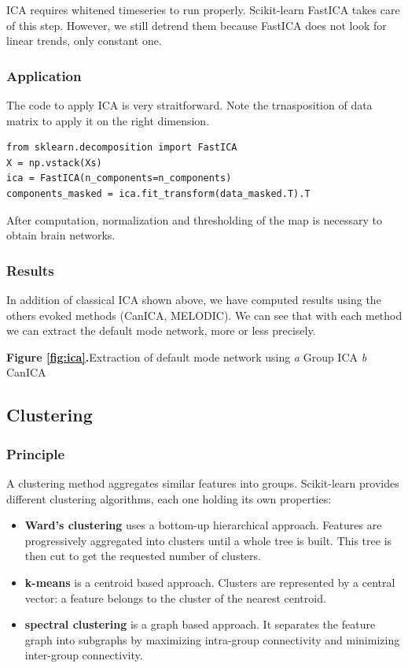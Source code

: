 \documentclass{frontiersSCNS} %
\newcommand{\alex}[1]{\todo[inline, color=green!40]{#1}}
\begin{document}
ICA requires whitened timeseries to run properly. Scikit-learn FastICA takes care
of this step. However, we still detrend them because
FastICA does not look for linear trends, only constant one.

\subsubsection{Application}

The code to apply ICA is very straitforward. Note the trnasposition of data
matrix to apply it on the right dimension.

\begin{lstlisting}
from sklearn.decomposition import FastICA
X = np.vstack(Xs)
ica = FastICA(n_components=n_components)
components_masked = ica.fit_transform(data_masked.T).T
\end{lstlisting}

After computation, normalization and thresholding of the map is necessary to
obtain brain networks.

\subsubsection{Results}

In addition of classical ICA shown above, we have computed results using the
others evoked methods (CanICA, MELODIC). We can see that with each method we can
extract the default mode network, more or less precisely.

\textbf{Figure \ref{fig:ica}.}{Extraction of default mode network using \textit{a} Group ICA
  \textit{b} CanICA}\label{fig:03}

\alex{MELODIC is missing}

\subsection{Clustering}

\subsubsection{Principle}

A clustering method aggregates similar features into groups. Scikit-learn
provides different clustering algorithms, each one holding its own properties:

\begin{itemize}
    \item{\bf Ward's clustering} uses a bottom-up hierarchical approach. Features are
        progressively aggregated into clusters until a whole tree is built. This
        tree is then cut to get the requested number of clusters.
    \item{\bf k-means} is a centroid based approach. Clusters are represented by
        a central vector: a feature belongs to the cluster of the nearest
        centroid.
    \item{\bf spectral clustering} is a graph based approach. It separates
        the feature graph into subgraphs by maximizing intra-group connectivity and
        minimizing inter-group connectivity.
\end{itemize}
\end{document}
